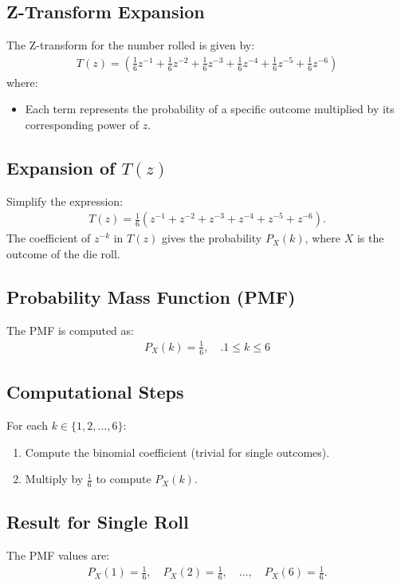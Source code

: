 \documentclass[journal]{IEEEtran}
\begin{document}
	\subsection*{Z-Transform Expansion}
	The Z-transform for the number rolled is given by:
	\begin{align}
		T(z) = \left( \frac{1}{6}z^{-1} + \frac{1}{6}z^{-2} + \frac{1}{6}z^{-3} + \frac{1}{6}z^{-4} + \frac{1}{6}z^{-5} + \frac{1}{6}z^{-6} \right)
	\end{align}
	where:
	\begin{itemize}
		\item Each term represents the probability of a specific outcome multiplied by its corresponding power of \(z\).
	\end{itemize}
	
	\subsection*{Expansion of \(T(z)\)}
	Simplify the expression:
	\begin{align}
		T(z) = \frac{1}{6}(z^{-1} + z^{-2} + z^{-3} + z^{-4} + z^{-5} + z^{-6}).
	\end{align}
	The coefficient of \(z^{-k}\) in \(T(z)\) gives the probability \(P_X(k)\), where \(X\) is the outcome of the die roll.
	
	\subsection*{Probability Mass Function (PMF)}
	The PMF is computed as:
	\begin{align}
		P_X(k) = \frac{1}{6}, \quad .1 \leq k \leq 6
	\end{align}
	
	\subsection*{Computational Steps}
	For each \(k \in \{1, 2, \dots, 6\}\):
	\begin{enumerate}
		\item Compute the binomial coefficient (trivial for single outcomes).
		\item Multiply by \(\frac{1}{6}\) to compute \(P_X(k)\).
	\end{enumerate}
	
	\subsection*{Result for Single Roll}
	The PMF values are:
	\begin{align}
		P_X(1) = \frac{1}{6}, \quad P_X(2) = \frac{1}{6}, \quad \dots, \quad P_X(6) = \frac{1}{6}.
	\end{align}
	
\end{document}
